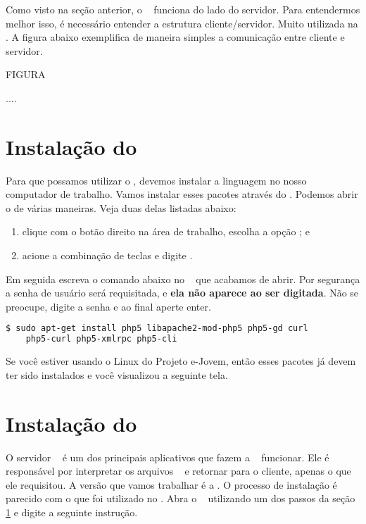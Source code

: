 Como visto na seção anterior, o \php~ funciona do lado do servidor. Para entendermos
melhor isso, é necessário entender a estrutura cliente/servidor. Muito utilizada
na \internet. A figura abaixo exemplifica de maneira simples a comunicação entre
cliente e servidor.

FIGURA

....

\section{Instalação do \php}
\label{instalacao-do-php}

Para que possamos utilizar o \php, devemos instalar a linguagem no nosso computador
de trabalho. Vamos instalar esses pacotes através do \terminal. Podemos abrir o
\terminal de várias maneiras. Veja duas delas listadas abaixo:

\begin{enumerate}
	\item clique com o botão direito na área de trabalho, escolha a opção
	; e
	\item acione a combinação de teclas \altfdois e digite \xfceterminal.
\end{enumerate}

Em seguida escreva o comando abaixo no \terminal~ que acabamos de abrir. Por segurança
a senha de usuário será requisitada, e \textbf{ela não aparece ao ser digitada}.
Não se preocupe, digite a senha e ao final aperte enter. 

\begin{lstlisting}[language=bash, style=Comandos]
  $ sudo apt-get install php5 libapache2-mod-php5 php5-gd curl 
  	php5-curl php5-xmlrpc php5-cli
\end{lstlisting}

Se você estiver usando o Linux do Projeto e-Jovem, então esses pacotes já devem
ter sido instalados e você visualizou a seguinte tela.


\section{Instalação do \apache}
\label{instalacao-do-apache}

O servidor \apache~ é um dos principais aplicativos que fazem a \web~ funcionar.
Ele é responsável por interpretar os arquivos \phpextensao~ e retornar para o
cliente, apenas o que ele requisitou. A versão que vamos trabalhar é a \apacheversao.
O processo de instalação é parecido com o que foi utilizado no \php. Abra o
\terminal~ utilizando um dos passos da seção \ref{instalacao-do-php} e digite a 
seguinte instrução.

